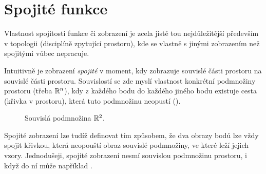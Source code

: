 \section{Spojité funkce}
\label{sec:spojite-funkce}

Vlastnost spojitosti funkce či zobrazení je zcela jistě tou nejdůležitější
především v topologii (disciplíně zpytující  prostoru), kde se vlastně
s jinými zobrazením než spojitými vůbec nepracuje.

Intuitivně je zobrazení \emph{spojité} v moment, kdy zobrazuje souvislé části
prostoru na souvislé části prostoru. Souvislostí se zde myslí vlastnost
konkrétní podmnožiny prostoru (třeba $\mathbb{R}^{n}$), kdy z každého bodu do každého
jiného bodu existuje cesta (křivka v prostoru), která tuto podmnožinu neopustí
().

\begin{figure}[ht]
 \centering
 \caption{Souvislá podmnožina $\mathbb{R}^2$.}
 \label{fig:souvisla-podmnozina}
\end{figure}

Spojité zobrazení lze tudíž definovat tím způsobem, že dva obrazy bodů lze vždy
spojit křivkou, která neopouští obraz souvislé podmnožiny, ve které leží jejich
vzory. Jednodušeji, spojité zobrazení nesmí  souvislou podmnožinu
prostoru, i když do ní může například .


